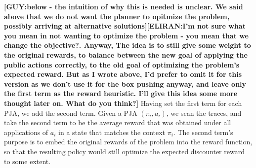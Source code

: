\documentclass[letterpaper]{article} %
\newcommand{\eliran}[1]{\textbf{[\color{red}ELIRAN:#1]}}
\newcommand{\guy}[1]{\textbf{[\color{orange}GUY:#1]}}
\begin{document}
\guy{below - the intuition of why this is needed is unclear. We said above that we do not want the planner to opitmize the problem, possibly arriving at alternative solutions}\eliran{I'm not sure what you mean in not wanting to optimize the problem - you mean that we change the objective?. Anyway, The idea is to still give some weight to the original rewards, to balance between the new goal of applying the public actions correctly, to the old goal of optimizing the problem's expected reward. But as I wrote above, I'd prefer to omit it for this version as we don't use it for the box pushing anyway, and leave only the first term as the reward heuristic. I'll give this idea some more thought later on. What do you think?}
Having set the first term for each PJA, we add the second term. Given a PJA $(\pi_i, a_i)$, we scan the traces, and take the second term to be the average reward that was obtained under all applications of $a_i$ in a state that matches the context $\pi_i$. The second term's purpose is to embed the original rewards of the problem into the reward function, so that the resulting policy would still optimize the expected discounter reward to some extent.

\end{document}
